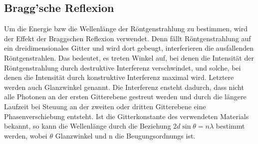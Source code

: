 \subsection{Bragg'sche Reflexion}
    Um die Energie bzw die Wellenlänge der Röntgenstrahlung zu bestimmen, wird der Effekt der Braggschen 
    Reflexion verwendet. Denn fällt Röntgenstrahlung auf ein dreidimensionales Gitter
    und wird dort gebeugt, interferieren die ausfallenden Röntgenstrahlen. Das bedeutet, es
    treten Winkel auf, bei denen die Intensität der Röntgenstrahlung durch destruktive Interferenz
    verschwindet, und solche, bei denen die Intensität durch konstruktive Interferenz maximal wird.
    Letztere werden auch Glanzwinkel genannt. Die Interferenz ensteht dadurch, dass nicht alle 
    Photonen an der ersten Gitterebene gestreut werden und durch die längere Laufzeit bei Steuung an 
    der zweiten oder dritten Gitterebene eine Phasenverschiebung entsteht. Ist die 
    Gitterkonstante des verwendeten Materials bekannt, so kann die Wellenlänge durch
    die Beziehung $2 d \sin{\theta}=n \lambda$ bestimmt werden, wobei $\theta$ Glanzwinkel
    und n die Beugungsordnungs ist.